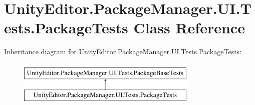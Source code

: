 \hypertarget{class_unity_editor_1_1_package_manager_1_1_u_i_1_1_tests_1_1_package_tests}{}\section{Unity\+Editor.\+Package\+Manager.\+U\+I.\+Tests.\+Package\+Tests Class Reference}
\label{class_unity_editor_1_1_package_manager_1_1_u_i_1_1_tests_1_1_package_tests}
Inheritance diagram for Unity\+Editor.\+Package\+Manager.\+U\+I.\+Tests.\+Package\+Tests\+:\begin{figure}[H]
\begin{center}
\leavevmode
\includegraphics[height=2.000000cm]{class_unity_editor_1_1_package_manager_1_1_u_i_1_1_tests_1_1_package_tests}
\end{center}
\end{figure}
